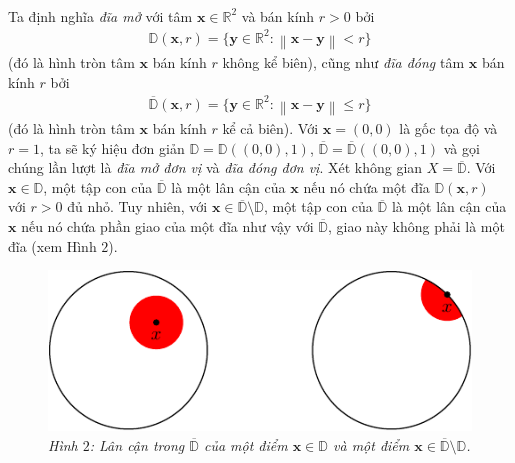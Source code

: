 \begin{multicols}{2}
\begin{align*}
	\end{align*}
	Ta định nghĩa {\it đĩa mở} với tâm $\mathbf{x} \in \mathbb{R}^2$ và bán kính $r > 0$ bởi
	\begin{align*}
		\mathbb{D}(\mathbf{x}, r) = \{ \mathbf{y} \in \mathbb{R}^2:  \left\|\mathbf{x} - \mathbf{y}\right\| < r\}
	\end{align*}
	(đó là hình tròn tâm $\mathbf{x}$ bán kính $r$ không kể biên), cũng như {\it đĩa đóng} tâm $\mathbf{x}$ bán kính $r$ bởi
	\begin{align*}
		\overline{\mathbb{D}}(\mathbf{x}, r) = \{ \mathbf{y} \in \mathbb{R}^2:  \left\|\mathbf{x} - \mathbf{y}\right\| \le r\}
	\end{align*}
	(đó là hình tròn tâm $\mathbf{x}$ bán kính $r$ kể cả biên). Với $\mathbf{x} = (0,0)$ là gốc tọa độ và $r = 1$, ta sẽ ký hiệu đơn giản $\mathbb{D} = \mathbb{D}((0,0),1)$, $\overline{\mathbb{D}} = \overline{\mathbb{D}}((0,0),1)$ và gọi chúng lần lượt là {\it đĩa mở đơn vị} và {\it đĩa đóng đơn vị}. Xét không gian $X = \overline{\mathbb{D}}$. Với $\mathbf{x} \in \mathbb{D}$, một tập con của $\overline{\mathbb{D}}$ là một lân cận của $\mathbf{x}$ nếu nó chứa một đĩa $\mathbb{D}(\mathbf{x},r)$ với $r > 0$ đủ nhỏ. Tuy nhiên, với $\mathbf{x} \in \overline{\mathbb{D}} \setminus \mathbb{D}$, một tập con của $\overline{\mathbb{D}}$ là một lân cận của $\mathbf{x}$ nếu nó chứa phần giao của một đĩa như vậy với $\overline{\mathbb{D}}$, giao này không phải là một đĩa (xem Hình $2$).
	\begin{figure}[H]
		\vspace*{-5pt}
		\centering\captionsetup{labelformat=empty, justification=centering}
		\includegraphics[width=1\linewidth]{H2.pdf}
		\caption{\small\textit{\color{duongvaotoanhoc}Hình $2$: Lân cận trong $\overline{\mathbb{D}}$ của một điểm $\mathbf{x} \in \mathbb{D}$ và một điểm $\mathbf{x} \in \overline{\mathbb{D}} \setminus \mathbb{D}$.}}
		\vspace*{-10pt}
	\end{figure}

\end{multicols}
